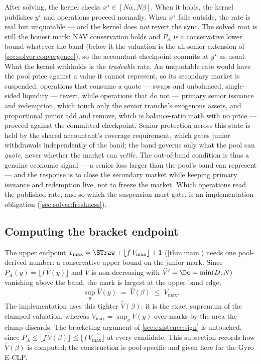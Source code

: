 After solving, the kernel checks $x^\star \in [N\alpha, N\beta]$. When it
holds, the kernel publishes $y^\star$ and operations proceed normally.
When $x^\star$ falls outside, the rate is real but unquotable --- and the
kernel does \emph{not} revert the sync. The solved root is still the honest
mark: NAV conservation holds and $P_A$ is a conservative lower bound
whatever the band (below it the valuation is the all-senior extension of
\cref{sec:solver:convergence}), so the accountant checkpoint commits at
$y^\star$ as usual. What the kernel withholds is the \emph{tradeable} rate.
An unquotable rate would have the pool price against a value it cannot
represent, so its secondary market is suspended: operations that consume a
quote --- swaps and unbalanced, single-sided liquidity --- revert, while
operations that do not --- primary senior issuance and redemption, which
touch only the senior tranche's exogenous assets, and proportional junior
add and remove, which is balance-ratio math with no price --- proceed
against the committed checkpoint. Senior protection across this state is
held by the shared accountant's coverage requirement, which gates junior
withdrawals independently of the band; the band governs only what the pool
can \emph{quote}, never whether the market can \emph{settle}. The
out-of-band condition is thus a genuine economic signal --- a senior loss
larger than the pool's band can represent --- and the response is to close
the secondary market while keeping primary issuance and redemption live,
not to freeze the market. Which operations read the published rate, and so
which the suspension must gate, is an implementation obligation
(\cref{sec:solver:freshness}).

\subsection{Computing the bracket endpoint}
\label{sec:solver:endpoint}

The upper endpoint $x_{\max} = \STraw + \lfloor f\,V_{\max}\rfloor + 1$
(\cref{thm:main}) needs one pool-derived number: a conservative upper
bound on the junior mark. Since $P_A(y) = \lfloor f\,\widehat{V}(y)\rfloor$
and $\widehat{V}$ is non-decreasing with $\widehat{V}' = \Dc = \min(D, N)$
vanishing above the band, the mark is largest at the upper band edge,
\[
  \sup_{y} \widehat{V}(y) \;=\; \widehat{V}(\beta) \;\leq\; V_{\max}.
\]
The implementation uses this tighter $\widehat{V}(\beta)$: it is the exact
supremum of the clamped valuation, whereas $V_{\max} = \sup_y V(y)$
over-marks by the area the clamp discards. The bracketing argument of
\cref{sec:existence:sign} is untouched, since
$P_A \leq \lfloor f\,\widehat{V}(\beta)\rfloor \leq \lfloor f\,V_{\max}\rfloor$
at every candidate. This subsection records how $\widehat{V}(\beta)$ is
computed; the construction is pool-specific and given here for the Gyro
E-CLP.

